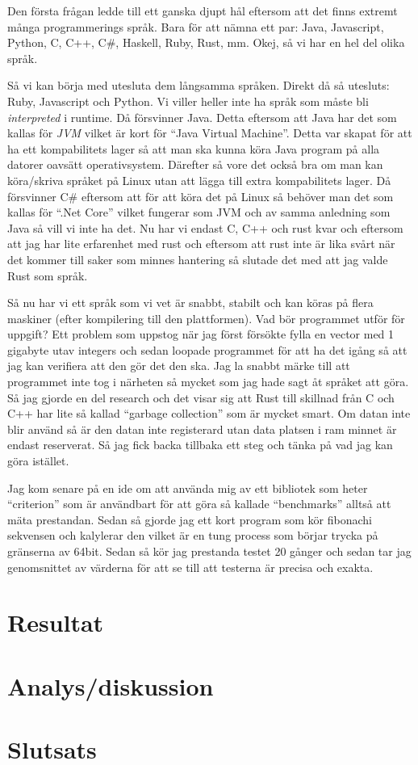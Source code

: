 \documentclass[12pt, a4paper]{report}
\begin{document}
Den första frågan ledde till ett ganska djupt hål eftersom att det finns extremt många programmerings språk. Bara för att nämna ett par: Java, Javascript, Python, C, C++, C\#, Haskell, Ruby, Rust, mm. Okej, så vi har en hel del olika språk.

Så vi kan börja med utesluta dem långsamma språken. Direkt då så utesluts: Ruby, Javascript och Python. Vi viller heller inte ha språk som måste bli \textit{interpreted} i runtime. Då försvinner Java. Detta eftersom att Java har det som kallas för \textit{JVM} vilket är kort för ``Java Virtual Machine''. Detta var skapat för att ha ett kompabilitets lager så att man ska kunna köra Java program på alla datorer oavsätt operativsystem. Därefter så vore det också bra om man kan köra/skriva språket på Linux utan att lägga till extra kompabilitets lager. Då försvinner C\# eftersom att för att köra det på Linux så behöver man det som kallas för ``.Net Core'' vilket fungerar som JVM och av samma anledning som Java så vill vi inte ha det. Nu har vi endast C, C++ och rust kvar och eftersom att jag har lite erfarenhet med rust och eftersom att rust inte är lika svårt när det kommer till saker som minnes hantering så slutade det med att jag valde Rust som språk.


Så nu har vi ett språk som vi vet är snabbt, stabilt och kan köras på flera maskiner (efter kompilering till den plattformen). Vad bör programmet utför för uppgift? Ett problem som uppstog när jag först försökte fylla en vector med 1 gigabyte utav integers och sedan loopade programmet för att ha det igång så att jag kan verifiera att den gör det den ska. Jag la snabbt märke till att programmet inte tog i närheten så mycket som jag hade sagt åt språket att göra. Så jag gjorde en del research och det visar sig att Rust till skillnad från C och C++ har lite så kallad ``garbage collection'' som är mycket smart. Om datan inte blir använd så är den datan inte registerard utan data platsen i ram minnet är endast reserverat. Så jag fick backa tillbaka ett steg och tänka på vad jag kan göra istället.

Jag kom senare på en ide om att använda mig av ett bibliotek som heter ``criterion'' som är användbart för att göra så kallade ``benchmarks'' alltså att mäta prestandan. Sedan så gjorde jag ett kort program som kör fibonachi sekvensen och kalylerar den vilket är en tung process som börjar trycka på gränserna av 64bit. Sedan så kör jag prestanda testet 20 gånger och sedan tar jag genomsnittet av värderna för att se till att testerna är precisa och exakta.

\section{Resultat}

\section{Analys/diskussion}



\section{Slutsats}


\printbibliography
\end{document}

